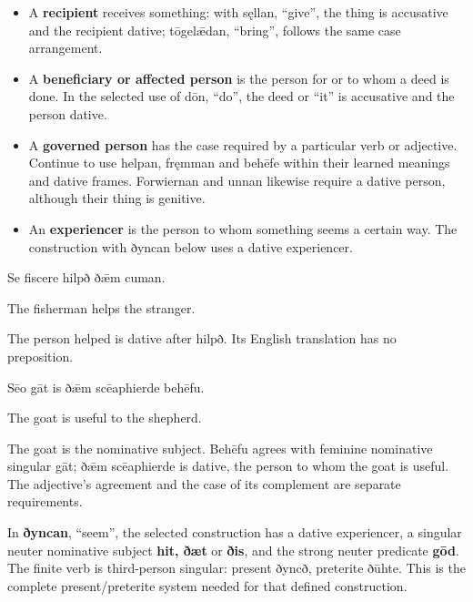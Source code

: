 \begin{itemize}
\item A \textbf{recipient} receives something: with sęllan, “give”, the thing is accusative and the recipient dative; tōgelǣdan, “bring”, follows the same case arrangement.
\item A \textbf{beneficiary or affected person} is the person for or to whom a deed is done. In the selected use of dōn, “do”, the deed or “it” is accusative and the person dative.
\item A \textbf{governed person} has the case required by a particular verb or adjective. Continue to use helpan, fręmman and behēfe within their learned meanings and dative frames. Forwiernan and unnan likewise require a dative person, although their thing is genitive.
\item An \textbf{experiencer} is the person to whom something seems a certain way. The construction with ðyncan below uses a dative experiencer.
\end{itemize}

Se fiscere hilpð ðǣm cuman.

The fisherman helps the stranger.

The person helped is dative after hilpð. Its English translation has no preposition.

Sēo gāt is ðǣm scēaphierde behēfu.

The goat is useful to the shepherd.

The goat is the nominative subject. Behēfu agrees with feminine nominative singular gāt; ðǣm scēaphierde is dative, the person to whom the goat is useful. The adjective's agreement and the case of its complement are separate requirements.

In \textbf{ðyncan}, “seem”, the selected construction has a dative experiencer, a singular neuter nominative subject \textbf{hit, ðæt} or \textbf{ðis}, and the strong neuter predicate \textbf{gōd}. The finite verb is third-person singular: present ðyncð, preterite ðūhte. This is the complete present/\allowbreak{}preterite system needed for that defined construction.

